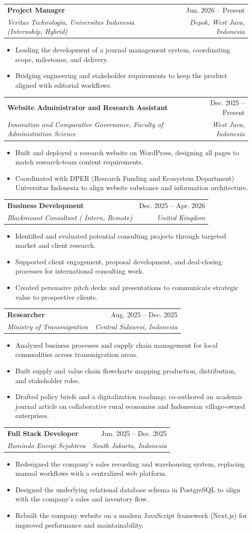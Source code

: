 \documentclass[letterpaper,11pt]{article}
\makeatletter
\newcommand{\resumeItem}[1]{
  \item\small{
    {#1 \vspace{-2pt}}
  }
}
\newcommand{\resumeSubheading}[4]{
  \vspace{-2pt}\item
    \begin{tabular*}{0.97\textwidth}[t]{l@{\extracolsep{\fill}}r}
      \textbf{#1} & #2 \\
      \textit{\small#3} & \textit{\small #4} \\
    \end{tabular*}\vspace{-7pt}
}
\newcommand{\resumeItemListStart}{\begin{itemize}}
\newcommand{\resumeItemListEnd}{\end{itemize}\vspace{-5pt}}
\makeatother
\begin{document}
    \resumeSubheading
      {Project Manager}{Jun. 2026 -- Present}
      {Veritas Technologia, Universitas Indonesia (Internship, Hybrid)}{Depok, West Java, Indonesia}
      \resumeItemListStart
        \resumeItem{Leading the development of a journal management system, coordinating scope, milestones, and delivery.}
        \resumeItem{Bridging engineering and stakeholder requirements to keep the product aligned with editorial workflows.}
      \resumeItemListEnd

    \resumeSubheading
      {Website Administrator and Research Assistant}{Dec. 2025 -- Present}
      {Innovation and Comparative Governance, Faculty of Administration Science}{West Java, Indonesia}
      \resumeItemListStart
        \resumeItem{Built and deployed a research website on WordPress, designing all pages to match research-team content requirements.}
        \resumeItem{Coordinated with DPER (Research Funding and Ecosystem Department) Universitas Indonesia to align website substance and information architecture.}
      \resumeItemListEnd

    \resumeSubheading
      {Business Development}{Dec. 2025 -- Apr. 2026}
      {Blackmount Consultant ( Intern, Remote)}{United Kingdom}
      \resumeItemListStart
        \resumeItem{Identified and evaluated potential consulting projects through targeted market and client research.}
        \resumeItem{Supported client engagement, proposal development, and deal-closing processes for international consulting work.}
        \resumeItem{Created persuasive pitch decks and presentations to communicate strategic value to prospective clients.}
      \resumeItemListEnd

    \resumeSubheading
      {Researcher}{Aug. 2025 -- Dec. 2025}
      {Ministry of Transmigration}{Central Sulawesi, Indonesia}
      \resumeItemListStart
        \resumeItem{Analyzed business processes and supply chain management for local commodities across transmigration areas.}
        \resumeItem{Built supply and value chain flowcharts mapping production, distribution, and stakeholder roles.}
        \resumeItem{Drafted policy briefs and a digitalization roadmap; co-authored an academic journal article on collaborative rural economies and Indonesian village-owned enterprises.}
      \resumeItemListEnd

    \resumeSubheading
      {Full Stack Developer}{Jun. 2025 -- Dec. 2025}
      {Bumindo Energi Sejahtera}{South Jakarta, Indonesia}
      \resumeItemListStart
        \resumeItem{Redesigned the company's sales recording and warehousing system, replacing manual workflows with a centralized web platform.}
        \resumeItem{Designed the underlying relational database schema in PostgreSQL to align with the company's sales and inventory flow.}
        \resumeItem{Rebuilt the company website on a modern JavaScript framework (Next.js) for improved performance and maintainability.}
      \resumeItemListEnd
\end{document}
